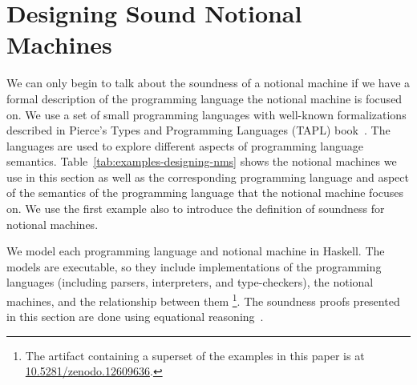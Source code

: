 \section{Designing Sound Notional Machines}
\label{chr:Modeling}

We can only begin to talk about the soundness of a notional machine if we have a
formal description of the programming language the notional machine is focused
on.
%
We use a set of small programming languages with well-known formalizations
described in
Pierce's Types and Programming Languages (TAPL) book~\citep{pierceTypesProgrammingLanguages2002}.
The languages are used to
explore different aspects of programming language semantics.
%
%
Table~\ref{tab:examples-designing-nms}
shows
the notional machines
we use in this section
as well as
the corresponding programming language
and aspect of the semantics of the programming language
that the notional machine focuses on.
%
We use the first example also to introduce the definition of soundness for notional machines.

We model each programming language and notional machine in Haskell.
The models are executable,
so they include implementations of the programming languages
(including parsers, interpreters, and type-checkers),
the notional machines,
and the relationship between them%
\footnote{%
The artifact containing a superset of the examples in this paper
is at
\href{https://zenodo.org/doi/10.5281/zenodo.12609636}{10.5281/zenodo.12609636}.
}.
The soundness proofs presented in this section are done using equational reasoning~\citep{gibbonsCalculatingFunctionalPrograms2002,birdAlgebraicIdentitiesProgram1989}.












